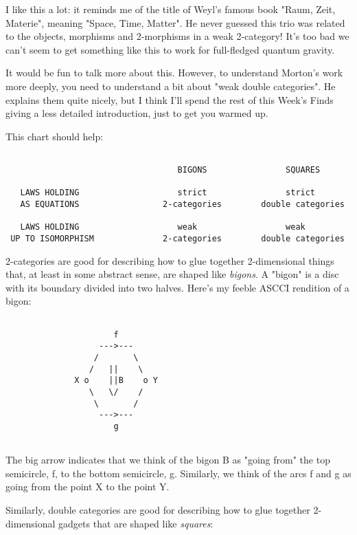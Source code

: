 I like this a lot: it reminds me of the title of Weyl's famous
book "Raum, Zeit, Materie", meaning "Space, Time, Matter".  
He never guessed this trio was related to the objects, morphisms and
2-morphisms in a weak 2-category!  It's too bad we can't seem to
get something like this to work for full-fledged quantum gravity.

It would be fun to talk more about this.  However, to understand Morton's 
work more deeply, you need to understand a bit about "weak double 
categories".  He explains them quite nicely, but I think I'll spend 
the rest of this Week's Finds giving a less detailed introduction, just
to get you warmed up.

This chart should help:


\begin{verbatim}

                                   BIGONS                SQUARES

   LAWS HOLDING                    strict                strict 
   AS EQUATIONS                 2-categories        double categories

   LAWS HOLDING                    weak                  weak
 UP TO ISOMORPHISM              2-categories        double categories
\end{verbatim}
    

2-categories are good for describing how to glue together
2-dimensional things that, at least in some abstract sense, are shaped
like \emph{bigons}.  A "bigon" is a disc with its boundary
divided into two halves.  Here's my feeble ASCCI rendition of a bigon:


\begin{verbatim}

                      f 
                   --->---
                  /       \
                 /   ||    \
              X o    ||B    o Y
                 \   \/    /
                  \       /
                   --->---
                      g
                     
\end{verbatim}
    
The big arrow indicates that we think of the bigon B as "going from" 
the top semicircle, f, to the bottom semicircle, g.  Similarly, we 
think of the arcs f and g as going from the point X to the point Y.  

Similarly, double categories are good for describing how to glue together 
2-dimensional gadgets that are shaped like \emph{squares}:


